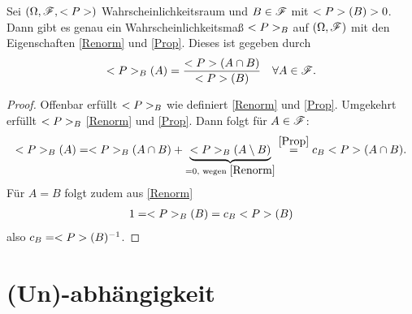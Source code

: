 \begin{lemma}
	Sei $(\Omega, \mathscr{F}, <P>)$ Wahrscheinlichkeitsraum und $B \in \mathscr{F}$ mit $<P>(B) > 0$. Dann gibt es genau ein Wahrscheinlichkeitsmaß $<P>_B$ auf $(\Omega, \mathscr{F})$ mit den Eigenschaften \eqref{Renorm} und \eqref{Prop}. Dieses ist gegeben durch
	\begin{align}
		<P>_{B}(A) = \frac{<P>(A\cap B)}{<P>(B)} \quad \forall A \in \mathscr{F}.\notag
	\end{align}
\end{lemma}

\begin{proof} %
	Offenbar erfüllt $<P>_{B}$ wie definiert \eqref{Renorm} und \eqref{Prop}. Umgekehrt erfüllt $<P>_{B}$ \eqref{Renorm} und \eqref{Prop}. Dann folgt für $A \in \mathscr{F}$:
	\begin{align}
		<P>_{B}(A) = <P>_{B}(A\cap B) + \underbrace{<P>_{B}(A\setminus B)}_{= 0, \text{ wegen } \eqref{Renorm}} \overset{\eqref{Prop}}{=} c_B <P>(A \cap B).\notag
	\end{align}
	Für $A=B$ folgt zudem aus \eqref{Renorm}
	\begin{align}
		1 = <P>_{B}(B) = c_B <P>(B)\notag
	\end{align}
	also $c_B = <P>(B)^{-1}$.
\end{proof}



\section{(Un)-abhängigkeit} \label{sec_unabhangigkeit}
